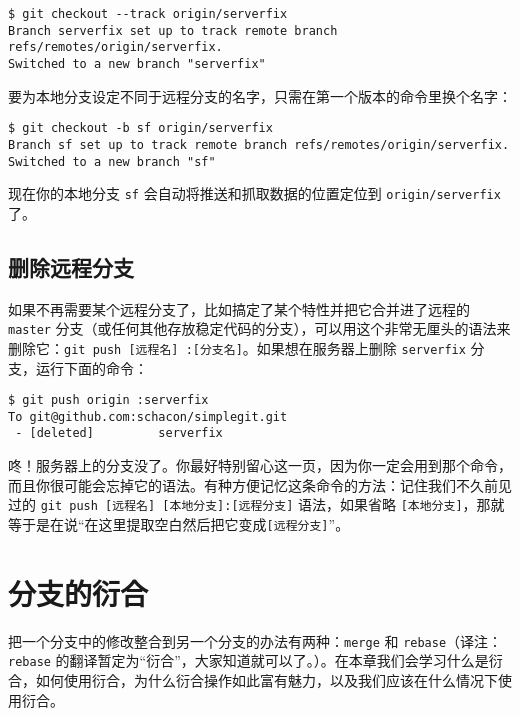 \documentclass[a4paper]{book}
\begin{document}
\begin{shaded}\begin{verbatim}
$ git checkout --track origin/serverfix
Branch serverfix set up to track remote branch refs/remotes/origin/serverfix.
Switched to a new branch "serverfix"
\end{verbatim}\end{shaded}

要为本地分支设定不同于远程分支的名字，只需在第一个版本的命令里换个名字：

\begin{shaded}\begin{verbatim}
$ git checkout -b sf origin/serverfix
Branch sf set up to track remote branch refs/remotes/origin/serverfix.
Switched to a new branch "sf"
\end{verbatim}\end{shaded}

现在你的本地分支 \texttt{sf} 会自动将推送和抓取数据的位置定位到 \texttt{origin/serverfix} 了。

\subsection{删除远程分支}

如果不再需要某个远程分支了，比如搞定了某个特性并把它合并进了远程的 \texttt{master} 分支（或任何其他存放稳定代码的分支），可以用这个非常无厘头的语法来删除它：\texttt{git push {[}远程名{]} :{[}分支名{]}}。如果想在服务器上删除 \texttt{serverfix} 分支，运行下面的命令：

\begin{shaded}\begin{verbatim}
$ git push origin :serverfix
To git@github.com:schacon/simplegit.git
 - [deleted]         serverfix
\end{verbatim}\end{shaded}

咚！服务器上的分支没了。你最好特别留心这一页，因为你一定会用到那个命令，而且你很可能会忘掉它的语法。有种方便记忆这条命令的方法：记住我们不久前见过的 \texttt{git push {[}远程名{]} {[}本地分支{]}:{[}远程分支{]}} 语法，如果省略 \texttt{{[}本地分支{]}}，那就等于是在说“在这里提取空白然后把它变成\texttt{{[}远程分支{]}}”。

\section{分支的衍合}

把一个分支中的修改整合到另一个分支的办法有两种：\texttt{merge} 和 \texttt{rebase}（译注：\texttt{rebase} 的翻译暂定为“衍合”，大家知道就可以了。）。在本章我们会学习什么是衍合，如何使用衍合，为什么衍合操作如此富有魅力，以及我们应该在什么情况下使用衍合。
\end{document}
